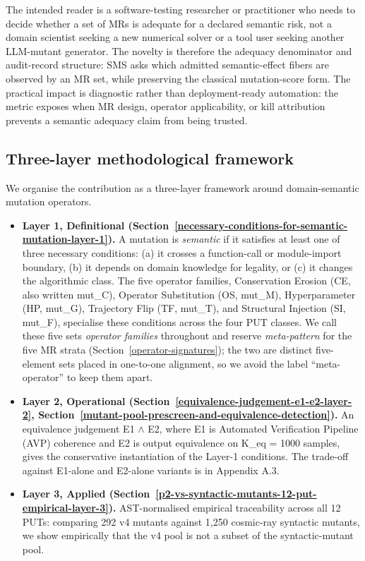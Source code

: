 \documentclass[manuscript,screen,review]{acmart}
\begin{document}
The intended reader is a software-testing researcher or practitioner who
needs to decide whether a set of MRs is adequate for a declared semantic
risk, not a domain scientist seeking a new numerical solver or a tool
user seeking another LLM-mutant generator. The novelty is therefore the
adequacy denominator and audit-record structure: SMS asks which admitted
semantic-effect fibers are observed by an MR set, while preserving the
classical mutation-score form. The practical impact is diagnostic rather
than deployment-ready automation: the metric exposes when MR design,
operator applicability, or kill attribution prevents a semantic adequacy
claim from being trusted.

\subsection{Three-layer methodological framework}\label{three-layer-methodological-framework}

We organise the contribution as a three-layer framework around
domain-semantic mutation operators.

\begin{itemize}

\item
  \textbf{Layer 1, Definitional (Section~\ref{necessary-conditions-for-semantic-mutation-layer-1}).} A mutation is \emph{semantic}
  if it satisfies at least one of three necessary conditions: (a) it
  crosses a function-call or module-import boundary, (b) it depends on
  domain knowledge for legality, or (c) it changes the algorithmic
  class. The five operator families, Conservation Erosion (CE, also
  written mut\_C), Operator Substitution (OS, mut\_M), Hyperparameter
  (HP, mut\_G), Trajectory Flip (TF, mut\_T), and Structural Injection
  (SI, mut\_F), specialise these conditions across the four PUT classes.
  We call these five sets \emph{operator families} throughout and reserve
  \emph{meta-pattern} for the five MR strata (Section~\ref{operator-signatures});
  the two are distinct five-element sets placed in one-to-one alignment,
  so we avoid the label ``meta-operator'' to keep them apart.
\item
  \textbf{Layer 2, Operational (Section~\ref{equivalence-judgement-e1-e2-layer-2}, Section~\ref{mutant-pool-prescreen-and-equivalence-detection}).} An equivalence judgement
  E1 $\wedge$ E2, where E1 is Automated Verification Pipeline (AVP) coherence
  and E2 is output equivalence on K\_eq = 1000 samples, gives the
  conservative instantiation of the Layer-1 conditions. The trade-off
  against E1-alone and E2-alone variants is in Appendix A.3.
\item
  \textbf{Layer 3, Applied (Section~\ref{p2-vs-syntactic-mutants-12-put-empirical-layer-3}).} AST-normalised empirical
  traceability across all 12 PUTs: comparing 292 v4 mutants against
  1,250 cosmic-ray syntactic mutants, we show empirically that the v4
  pool is not a subset of the syntactic-mutant pool.
\end{itemize}
\end{document}
